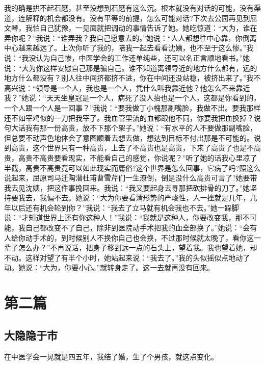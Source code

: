 \documentclass[12pt,oneside]{book}
\begin{document}
我的确是拱不起石磨，甚至没想到石磨有这么沉。根本就没有对话的可能，没有渠道，连解释的机会都没有。没有平等的前提，怎么可能对话?下次去公园再见到屈文琴，我怕自己犹豫，一见面就把调动的事情告诉了她。她吃惊道：``大为，谁在弄你呢？''我说：``谁弄我？我自己愿意去的。''她说：``人人都想往中心靠，你倒离中心越来越远了。上次你听了我的，陪我一起去看看沈姨，也不至于这么惨。''我说：``我没认为自己惨，中医学会的工作还单纯些，还可以名正言顺地看书。''她说：``大为你这样安慰自己那是骗自己。谁不知道离领导近的地方什么都有，远的地方什么都没有？别人往中间挤都挤不进，你在中间还没站稳，被挤出来了。''我不高兴说：``领导是一个人，我也是一个人，凭什么叫我靠近他？他怎么不来靠近我？''她说：``天天坐皇冠是一个人，病死了没人抬也是一个人，这都是你看到的，一个人跟一个人是一回事？''我说：``要我做丁小槐那副嘴脸，我做不出。要我那样还不如宰鸡似的一刀把我宰了。我血管里流的血都跟他不同，你要我把血换掉？说句大话我有那一份高贵，放不下那个架子。''她说：``有水平的人不要做那副嘴脸，但总要不动声色地体会了意图顺着去想去做，想达到目标不付出那是不可能的。说到高贵，这个世界只有一种高贵，上去了不高贵也是高贵，下来了高贵了也是不高贵，高贵不高贵要看现实，不能看自己的感觉，你说呢？''听了她的话我心里凉了半截，高贵不高贵竟可以如此现实而庸俗?这个世界是怎么回事，它病了吗?照这么说起来，屈原司马迁陶潜杜甫曹雪芹们一生潦倒，倒是没什么高贵可言了?她要带我去见沈姨，把这件事挽回来。我说：``我又要起身去寻那把砍排骨的刀了。''她坚持要我去，我偏不去。她说：``大为你要看清形势的严峻性，人一挫就是几年，几年以后还有机会轮到你？''我说：``我去了立马就有机会我也不去。''她一跺脚说：``才知道世界上还有你这种人！''我说：``我就是这种人，你要改变我，那不可能，我自己都改变不了自己，除非到医院动手术把我的血全部换了。''她说：``会有人给你动手术的，到时候别人不换你自己也会换，不过那时候就太晚了，看你这一辈子怎么办？''不再说话，把身子移到远一点的石头上，望着我。我也望着她，却不动。这样对望了有半个小时，她站起来说：``我去了。''我的头似摇似点地动了动。她说：``大为，你要小心。''就转身走了。这一去就再没有回来。

\part{第二篇}
\chapter{大隐隐于市}
在中医学会一晃就是四五年，我结了婚，生了个男孩，就这点变化。
\end{document}

